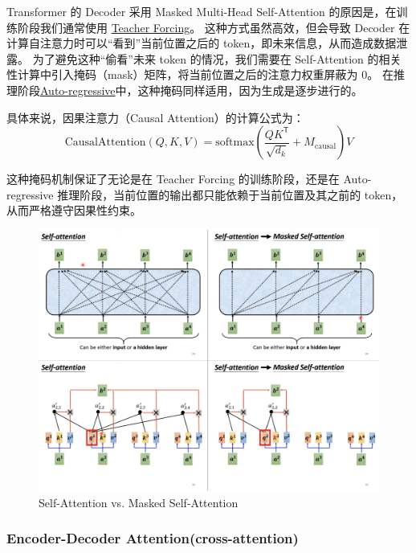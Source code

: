 Transformer 的 Decoder 采用 Masked Multi-Head Self-Attention 的原因是，在训练阶段我们通常使用 {\color{tred}\hyperref[def:teacher-forcing]{Teacher Forcing}}。  
这种方式虽然高效，但会导致 Decoder 在计算自注意力时可以“看到”当前位置之后的 token，即未来信息，从而造成数据泄露。  
为了避免这种“偷看”未来 token 的情况，我们需要在 Self-Attention 的相关性计算中引入掩码（mask）矩阵，将当前位置之后的注意力权重屏蔽为 0。  
在推理阶段{\color{dblue}\hyperref[def:auto-regressive]{Auto-regressive}}中，这种掩码同样适用，因为生成是逐步进行的。

具体来说，因果注意力（Causal Attention）的计算公式为：
\begin{equation}
\text{CausalAttention}(Q, K, V) = \text{softmax}\left(\frac{QK^\mathsf{T}}{\sqrt{d_k}} + M_{\text{causal}}\right)V
\tag{2.3}
\end{equation}


这种掩码机制保证了无论是在 Teacher Forcing 的训练阶段，还是在 Auto-regressive 推理阶段，当前位置的输出都只能依赖于当前位置及其之前的 token，从而严格遵守因果性约束。


\begin{figure}[htbp]
  \centering
  \includegraphics[width=0.9\linewidth]{figs/lec2/lec2.23.png}
  \caption{Self-Attention vs. Masked Self-Attention}
  \label{fig:Self-Attention vs. Masked Self-Attention}
\end{figure}


\clearpage

\subsubsection{Encoder-Decoder Attention(cross-attention)}


